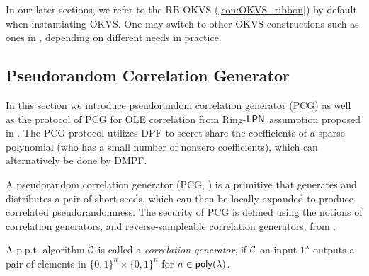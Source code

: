 In our later sections, we refer to the RB-OKVS (\cref{con:OKVS_ribbon}) by default when instantiating OKVS. One may switch to other OKVS constructions such as ones in \cite{cryptoeprint:2021/883,cryptoeprint:2022/320}, depending on different needs in practice. 

\subsection{Pseudorandom Correlation Generator}
In this section we introduce pseudorandom correlation generator (PCG) as well as the protocol of PCG for OLE correlation from Ring-${\sf LPN}$ assumption proposed in \cite{cryptoeprint:2022/1035}. The PCG protocol utilizes DPF to secret share the coefficients of a sparse polynomial (who has a small number of nonzero coefficients), which can alternatively be done by DMPF. 

A pseudorandom correlation generator (PCG, \cite{cryptoeprint:2019/273,cryptoeprint:2019/448}) is a primitive that generates and distributes a pair of short seeds, which can then be locally expanded to produce correlated pseudorandomness. The security of PCG is defined using the notions of correlation generators, and reverse-sampleable correlation generators, from \cite{cryptoeprint:2019/448}. 

\begin{definition}\label{def:correlation_generator}A p.p.t. algorithm $\mathcal{C}$ is called a \emph{correlation generator}, if $\mathcal{C}$ on input $1^\lambda$ outputs a pair of elements in $\{0, 1\}^n \times \{0, 1\}^n$ for $n \in {\sf poly}(\lambda)$. 
\end{definition} 

